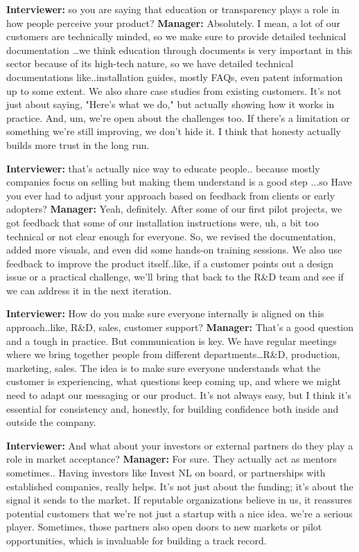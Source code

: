 \textbf{Interviewer:} so you are saying that education or transparency plays a role in how people perceive your product? \newline
\textbf{Manager:} Absolutely. I mean, a lot of our customers are technically minded, so we make sure to provide detailed technical documentation …we think education through documents is very important in this sector because of its high-tech nature, so we have detailed technical documentations  like..installation guides, mostly FAQs, even patent information up to some extent. We also share case studies from existing customers. It's not just about saying, "Here's what we do," but actually showing how it works in practice. And, um, we're open about the challenges too. If there's a limitation or something we're still improving, we don't hide it. I think that honesty actually builds more trust in the long run. \newline

\textbf{Interviewer:} that's actually nice way to educate people.. because mostly companies focus on selling but making them understand is a good step ...so Have you ever had to adjust your approach based on feedback from clients or early adopters?
\textbf{Manager:} Yeah, definitely. After some of our first pilot projects, we got feedback that some of our installation instructions were, uh, a bit too technical or not clear enough for everyone. So, we revised the documentation, added more visuals, and even did some hands-on training sessions. We also use feedback to improve the product itself..like, if a customer points out a design issue or a practical challenge, we'll bring that back to the R\&D team and see if we can address it in the next iteration.

\textbf{Interviewer:} How do you make sure everyone internally is aligned on this approach..like, R\&D, sales, customer support? \newline
\textbf{Manager:} That's a good question and a tough in practice. But communication is key. We have regular meetings where we bring together people from different departments…R\&D, production, marketing, sales. The idea is to make sure everyone understands what the customer is experiencing, what questions keep coming up, and where we might need to adapt our messaging or our product. It's not always easy, but I think it's essential for consistency and, honestly, for building confidence both inside and outside the company. \newline

\textbf{Interviewer:} And what about your investors or external partners do they play a role in market acceptance? \newline
\textbf{Manager:} For sure. They actually act as mentors sometimes.. Having investors like Invest NL on board, or partnerships with established companies, really helps. It's not just about the funding; it's about the signal it sends to the market. If reputable organizations believe in us, it reassures potential customers that we're not just a startup with a nice idea. we're a serious player. Sometimes, those partners also open doors to new markets or pilot opportunities, which is invaluable for building a track record. \newline

